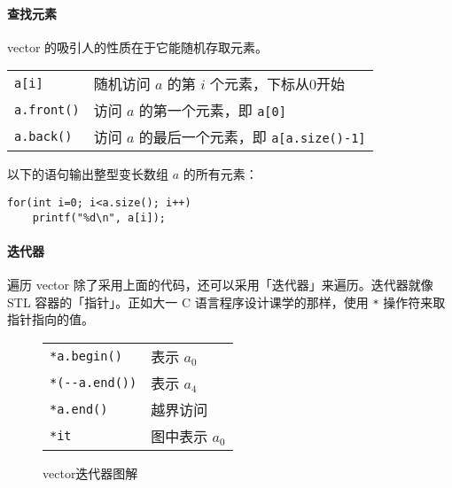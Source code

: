 \documentclass[UTF8]{ctexart}
\newcommand\Emph[1]{\colorbox{green!10}{\textcolor{green!30!black}{#1}}}
\begin{document}
\paragraph{查找元素} vector 的吸引人的性质在于它能\Emph{随机存取}元素。
\begin{table}[H]
  \centering
  \begin{tabular}{ll}
  \verb!a[i]! & 随机访问 $a$ 的第 $i$ 个元素，下标从0开始 \\
  \verb!a.front()! & 访问 $a$ 的第一个元素，即 \verb!a[0]! \\
  \verb!a.back()! & 访问 $a$ 的最后一个元素，即 \verb!a[a.size()-1]! \\
  \end{tabular}
\end{table}

以下的语句输出整型变长数组 $a$ 的所有元素：
\begin{lstlisting}[numbers=none]
for(int i=0; i<a.size(); i++)
    printf("%d\n", a[i]);
\end{lstlisting}

\paragraph{迭代器} 遍历 vector 除了采用上面的代码，还可以采用「迭代器」来遍历。迭代器就像 STL 容器的「指针」。正如大一 C 语言程序设计课学的那样，使用 \verb!*! 操作符来取指针指向的值。

\begin{figure}[htb]
  \begin{minipage}[t]{.5\textwidth}
  \centering
  \vspace{0pt}
  \end{minipage}
  \begin{minipage}[t]{.48\textwidth}
      \vspace{0pt}
      \centering
      \begin{tabular}{ll}
        \verb!*a.begin()! & 表示 $a_0$ \\
        \verb!*(--a.end())! & 表示 $a_4$ \\
        \verb!*a.end()! & 越界访问 \\
        \verb!*it! & 图中表示 $a_0$ \\
      \end{tabular}
  \end{minipage}

%
%
  \caption{vector迭代器图解}\label{fig:vector-iterator}
\end{figure}
\end{document}
